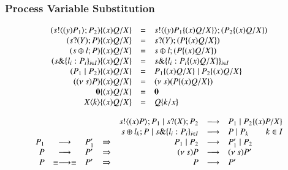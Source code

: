 \subsubsection{Process Variable Substitution}
\[
	\begin{array}{rclcrcl}
		(s ! \langle (y)P_1 \rangle ; P_2) \{(x)Q/X \} &=& s ! \langle (y)P_1 \{(x)Q/X \} \rangle ; (P_2 \{(x)Q/X \}) \\
		(s ? (Y) ; P) \{(x)Q/X \} &=& s ? (Y) ; (P \{(x)Q/X \}) \\
		(s \oplus l ; P) \{(x)Q/X \} &=& s \oplus l ; (P \{(x)Q/X \})\\
		(s \& \{l_i : P_i\}_{i \in I}) \{(x)Q/X \} &=& s \& \{l_i : P_i \{(x)Q/X \}\}_{i \in I}\\
		(P_1 \;|\; P_2) \{(x)Q/X \} & = & P_1 \{(x)Q/X \} \;|\; P_2 \{(x)Q/X \}\\
		((\nu\ s) P) \{(x)Q/X \} & = & (\nu\ s) (P \{(x)Q/X \})\\
		\mathbf{0} \{(x)Q/X \} & = & \mathbf{0}\\
		X\langle k \rangle \{(x)Q/X \} & = & Q \{k/x \}
	\end{array}
\]

\[
	\begin{array}{rclcrcl}
		&& & & s ! \langle (x)P \rangle ; P_1 \;|\; s ? (X) ; P_2 &\longrightarrow& P_1 \;|\; P_2 \{(x)P/X \} \\
		&& & & s \oplus l_k ; P \;|\; s \& \{l_i : P_i\}_{i \in I} &\longrightarrow& P \;|\; P_k \qquad k \in I\\
		P_1 &\longrightarrow& P_1' &\Rightarrow& P_1 \;|\; P_2 &\longrightarrow& P_1' \;|\; P_2\\
		P &\longrightarrow& P' &\Rightarrow& (\nu\ s) P &\longrightarrow& (\nu\ s) P'\\
		P &\equiv \longrightarrow \equiv& P'&\Rightarrow& P &\longrightarrow& P' 		
	\end{array}
\]
